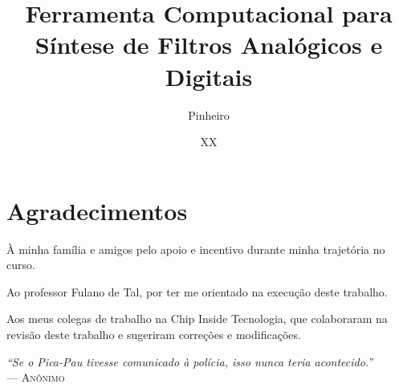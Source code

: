 \documentclass[tg]{mdtufsm}
\title{Ferramenta Computacional para Síntese de Filtros Analógicos e Digitais}
\author{Pinheiro}{Renan Birck}
\institute{Centro de Tecnologia}
\date{XX}{junho}{2015}
\begin{document}
\maketitle

\restoregeometry


\makeapprove


\chapter*{Agradecimentos}
À minha família e amigos pelo apoio e incentivo durante minha trajetória no curso.

Ao professor Fulano de Tal, por ter me orientado na execução deste trabalho.

Aos meus colegas de trabalho na Chip Inside Tecnologia, que colaboraram na revisão deste trabalho e sugeriram correções e modificações.

\clearpage
\begin{flushright}
\mbox{}\vfill
{\sffamily\itshape
``Se o Pica-Pau tivesse comunicado à polícia, isso nunca teria acontecido.'' \\ }
--- \textsc{Anônimo}
\end{flushright}
\end{document}
